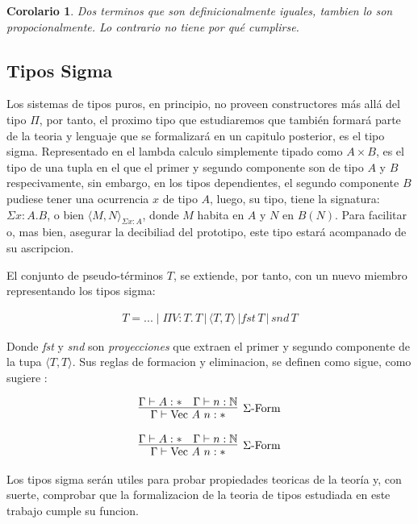 \documentclass[a4paper,12pt]{report}
\theoremstyle{definition}
\theoremstyle{plain}
\newtheorem{corollary}[theorem]{Corolario}
\theoremstyle{remark}
\begin{document}
\begin{corollary}
    Dos terminos que son definicionalmente iguales, tambien lo son propocionalmente. Lo contrario no tiene por qué cumplirse.
\end{corollary}

\subsection{Tipos Sigma}
Los sistemas de tipos puros, en principio, no proveen constructores más allá del tipo $\Pi$, por tanto, el proximo tipo que estudiaremos que también formará parte de la teoria y lenguaje que se formalizará en un capitulo posterior, es el tipo sigma. Representado en el lambda calculo simplemente tipado como $A \times B$, es el tipo de una tupla en el que el primer y segundo componente son de tipo $A$ y $B$ respecivamente, sin embargo, en los tipos dependientes, el segundo componente $B$ pudiese tener una ocurrencia $x$ de tipo $A$, luego, su tipo, tiene la signatura: $\Sigma x : A . B$, o bien $\langle M, N \rangle_{\Sigma x : A}$, donde $M$ habita en $A$ y $N$ en $B(N)$. Para facilitar o, mas bien, asegurar la decibiliad del prototipo, este tipo estará acompanado de su ascripcion.

El conjunto de pseudo-términos $T$, se extiende, por tanto, con un nuevo miembro representando los tipos sigma:

    \begin{align*}
      T = ... \mid \Pi V: T.\, T \,|\, \langle T, T \rangle\, | \textit{fst}\,T\,|\, \textit{snd}\, T
    \end{align*}

    Donde \textit{fst} y \textit{snd} son \textit{proyecciones} que extraen el primer y segundo componente de la tupa $\langle T, T \rangle$. Sus reglas de formacion y eliminacion, se definen como sigue, como sugiere \citep{hoffman2009}:

\begin{gather}
  \infer[\text{$\Sigma$-Form}]
  {\Gamma \vdash \mathrm{Vec}\ A\ n : *}
  {\Gamma \vdash A : * & \Gamma \vdash n : \mathbb{N}}
\end{gather}

\begin{gather}
  \infer[\text{$\Sigma$-Form}]
  {\Gamma \vdash \mathrm{Vec}\ A\ n : *}
  {\Gamma \vdash A : * & \Gamma \vdash n : \mathbb{N}}
\end{gather}

Los tipos sigma serán utiles para probar propiedades teoricas de la teoría y, con suerte, comprobar que la formalizacion de la teoria de tipos estudiada en este trabajo cumple su funcion.
    
\end{document}
